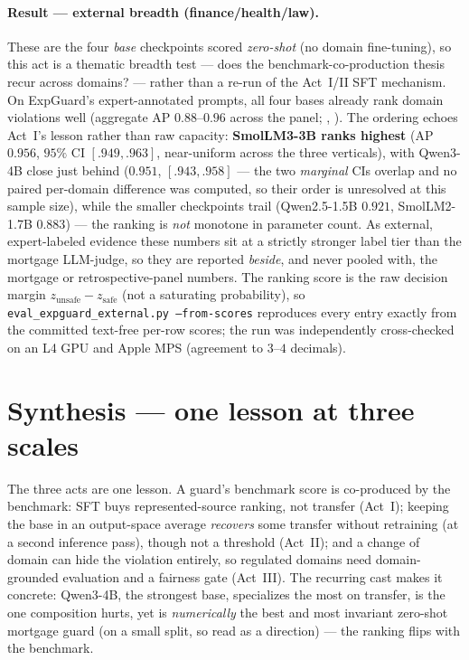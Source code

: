 \documentclass[11pt]{article}
\newcommand{\code}[1]{\texttt{\small #1}}
\begin{document}
\paragraph{Result --- external breadth (finance/health/law).} These are the four \emph{base} checkpoints
scored \emph{zero-shot} (no domain fine-tuning), so this act is a thematic breadth test --- does the
benchmark-co-production thesis recur across domains? --- rather than a re-run of the Act~I/II SFT
mechanism. On ExpGuard's expert-annotated prompts, all four bases already rank domain violations well
(aggregate AP $0.88$--$0.96$ across the panel; , ). The
ordering echoes Act~I's lesson rather than raw capacity: \textbf{SmolLM3-3B ranks highest} (AP $0.956$,
$95\%$ CI $[.949,.963]$, near-uniform across the three verticals), with Qwen3-4B close
just behind ($0.951$, $[.943,.958]$ --- the two \emph{marginal} CIs overlap and no paired per-domain
difference was computed, so their order is unresolved at this sample
size), while the smaller checkpoints trail (Qwen2.5-1.5B $0.921$, SmolLM2-1.7B $0.883$) --- the ranking is
\emph{not} monotone in parameter count.
As external, expert-labeled evidence these numbers sit at a strictly stronger label tier than the mortgage
LLM-judge, so they are reported \emph{beside}, and never pooled with, the mortgage or retrospective-panel
numbers. The ranking score is the raw decision margin $z_{\text{unsafe}}-z_{\text{safe}}$ (not a saturating
probability), so \code{eval\_expguard\_external.py --from-scores} reproduces every entry exactly from the
committed text-free per-row scores; the run was independently cross-checked on an L4 GPU and Apple MPS
(agreement to $3$--$4$ decimals).


\section{Synthesis --- one lesson at three scales}
\label{sec:synthesis}
The three acts are one lesson. A guard's benchmark score is co-produced by the benchmark: SFT buys
represented-source ranking, not transfer (Act~I); keeping the base in an output-space average
\emph{recovers} some transfer without retraining (at a second inference pass), though not a threshold (Act~II); and a change of
domain can hide the violation entirely, so regulated domains need domain-grounded evaluation and a
fairness gate (Act~III).
The recurring cast makes it concrete: Qwen3-4B, the strongest base, specializes the most on transfer,
is the one composition hurts, yet is \emph{numerically} the best and most invariant zero-shot mortgage
guard (on a small split, so read as a direction) --- the ranking flips with the benchmark.
\end{document}
